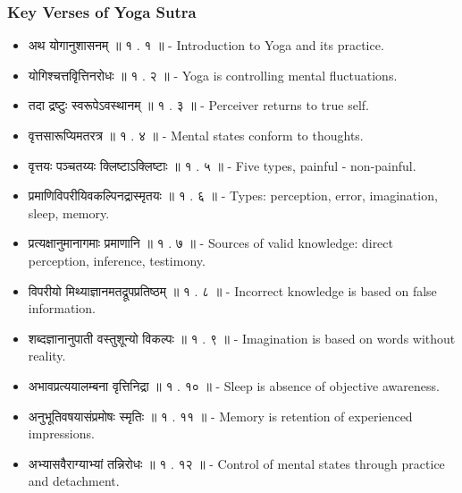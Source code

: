 \begin{frame}[fragile]\frametitle{Key Verses of Yoga Sutra}

    \begin{itemize}
        \item अथ योगानुशासनम् ॥ १ . १ ॥ - Introduction to Yoga and its practice.
        \item योगिश्चत्तवृित्तिनरोधः ॥ १ . २ ॥ - Yoga is controlling mental fluctuations.
        \item तदा द्रष्टुः स्वरूपेऽवस्थानम् ॥ १ . ३ ॥ - Perceiver returns to true self.
        \item वृत्तसारूप्यिमतरत्र ॥ १ . ४ ॥ - Mental states conform to thoughts.
        \item वृत्तयः पञ्चतय्यः क्लिष्टाऽक्लिष्टाः ॥ १ . ५ ॥ - Five types,  painful - non-painful.
        \item प्रमाणिविपरीयिवकल्पिनद्रास्मृतयः ॥ १ . ६ ॥ - Types: perception, error, imagination, sleep, memory.
        \item प्रत्यक्षानुमानागमाः प्रमाणानि ॥ १ . ७ ॥ - Sources of valid knowledge: direct perception, inference, testimony.
        \item विपरीयो मिथ्याज्ञानमतद्रूपप्रतिष्ठम् ॥ १ . ८ ॥ - Incorrect knowledge is based on false information.
        \item शब्दज्ञानानुपाती वस्तुशून्यो विकल्पः ॥ १ . ९ ॥ - Imagination is based on words without reality.
        \item अभावप्रत्ययालम्बना वृत्तिनिद्रा ॥ १ . १० ॥ - Sleep is absence of objective awareness.
        \item अनुभूतिवषयासंप्रमोषः स्मृतिः ॥ १ . ११ ॥ - Memory is retention of experienced impressions.
        \item अभ्यासवैराग्याभ्यां तन्निरोधः ॥ १ . १२ ॥ - Control of mental states through practice and detachment.
    \end{itemize}

\end{frame}

